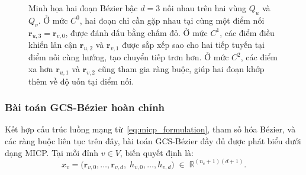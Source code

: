 \begin{figure}[htbp]
\begin{tikzpicture}[scale=0.9, >=latex]
    \end{tikzpicture}
    \caption[Ràng buộc liên tục $C^0$, $C^1$, $C^2$ tại điểm chuyển tiếp]{%
        Minh họa hai đoạn Bézier bậc $d=3$ nối nhau trên hai vùng
        $Q_u$ và $Q_v$. Ở mức $C^0$, hai đoạn chỉ cần gặp nhau tại cùng một
        điểm nối $\mathbf{r}_{u,3}=\mathbf{r}_{v,0}$, được đánh dấu bằng
        chấm đỏ. Ở mức $C^1$, các điểm điều khiển lân cận
        $\mathbf{r}_{u,2}$ và $\mathbf{r}_{v,1}$ được sắp xếp sao cho hai
        tiếp tuyến tại điểm nối cùng hướng, tạo chuyển tiếp trơn hơn. Ở mức
        $C^2$, các điểm xa hơn $\mathbf{r}_{u,1}$ và $\mathbf{r}_{v,2}$
        cũng tham gia ràng buộc, giúp hai đoạn khớp thêm về độ uốn tại điểm nối.}
    \label{fig:continuity_conditions}
\end{figure}

\subsubsection{Bài toán GCS-Bézier hoàn chỉnh}
\label{subsubsec:GCS-Bézier_complete}

Kết hợp cấu trúc luồng mạng từ~\eqref{eq:micp_formulation}, tham số hóa Bézier,
và các ràng buộc liên tục trên đây, bài toán GCS-Bézier đầy đủ được phát biểu
dưới dạng MICP. Tại mỗi đỉnh $v \in V$, biến quyết định là:
\[
    x_v = \bigl(\mathbf{r}_{v,0}, \ldots, \mathbf{r}_{v,d},\;
    h_{v,0}, \ldots, h_{v,d}\bigr)
    \;\in\; \mathbb{R}^{(n_c + 1)(d+1)}.
\]

